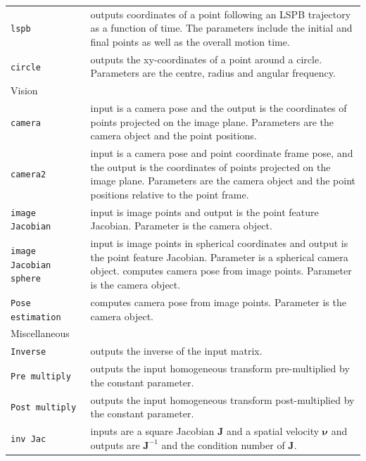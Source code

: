 \documentclass[a4paper,twoside]{report}
\begin{document}
\begin{longtable}{p{}p{}}
\texttt{lspb} &outputs coordinates of a point following an LSPB trajectory as a function of time. The parameters include the initial and final points as well as the overall motion time.\\

\texttt{circle} & outputs the xy-coordinates of a point around a circle. Parameters are the centre, radius and angular frequency.\\


\cmidrule{1-1}
Vision \\
\texttt{camera} & input is a camera pose and the output is the coordinates of points projected on the image plane. Parameters are the camera object and the point positions.\\

\texttt{camera2} &input is a camera pose and point coordinate frame pose, and the output is the coordinates of points projected on the image plane. Parameters are the camera object and the point positions relative to the point frame.\\

\texttt{image Jacobian} &input is image points and output is the point feature Jacobian. Parameter is the camera object.\\

\texttt{image Jacobian sphere} &input is image points in spherical coordinates and output is the point feature Jacobian. Parameter is a spherical camera object. computes camera pose from image points. Parameter is the camera object.\\

\texttt{Pose estimation} & computes camera pose from image points. Parameter is the camera object.\\


\cmidrule{1-1}
Miscellaneous \\


\texttt{Inverse} & outputs the inverse of the input matrix.\\

\texttt{Pre multiply} & outputs the input homogeneous transform pre-multiplied by the constant parameter.\\

\texttt{Post multiply} & outputs the input homogeneous transform post-multiplied by the constant parameter.\\

\texttt{inv Jac} & inputs are a square Jacobian $\mathbf{J}$ and a spatial velocity  $\mathbf{\nu}$ and outputs are $\mathbf{J}^{-1}$  and the condition number of $\mathbf{J}$.\\


\end{longtable}
\end{document}
